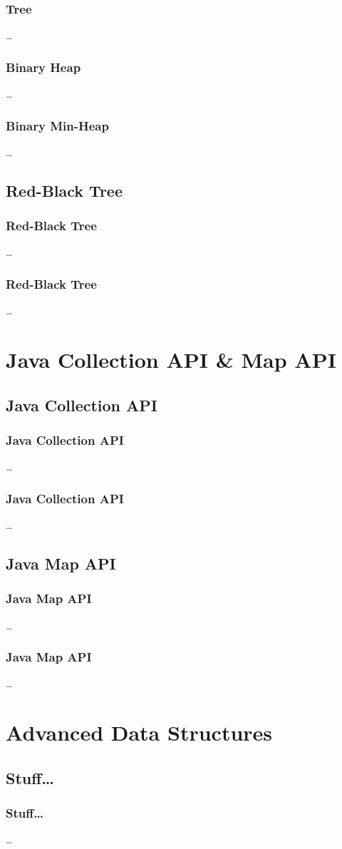 \documentclass{beamer}
\begin{document}
\begin{frame}
	\frametitle{Tree}
	\ldots
\end{frame}

\begin{frame}
	\frametitle{Binary Heap}
	\ldots
\end{frame}
\begin{frame}
	\frametitle{Binary Min-Heap}
	\ldots
\end{frame}

\subsection{Red-Black Tree}

\begin{frame}
	\frametitle{Red-Black Tree}
	\ldots
\end{frame}
\begin{frame}
	\frametitle{Red-Black Tree}
	\ldots
\end{frame}

\section{Java Collection API \& Map API}

\subsection{Java Collection API}

\begin{frame}
	\frametitle{Java Collection API}
	\ldots
\end{frame}
\begin{frame}
	\frametitle{Java Collection API}
	\ldots
\end{frame}

\subsection{Java Map API}

\begin{frame}
	\frametitle{Java Map API}
	\ldots
\end{frame}
\begin{frame}
	\frametitle{Java Map API}
	\ldots
\end{frame}


\section{Advanced Data Structures}

\subsection{Stuff\ldots}

\begin{frame}
	\frametitle{Stuff\ldots}
	\ldots
\end{frame}
\end{document}
